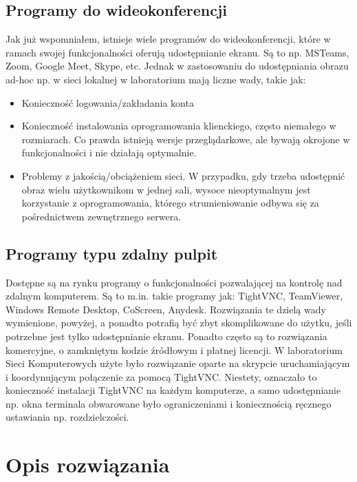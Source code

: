 \documentclass[a4paper,11pt]{article}
\begin{document}
        \subsection{Programy do wideokonferencji}
        Jak już wspomniałem, istnieje wiele programów do wideokonferencji, które w ramach swojej funkcjonalności oferują udostępnianie ekranu. Są to np. MSTeams, Zoom, Google Meet, Skype, etc.
        Jednak w zastosowaniu do udostępniania obrazu ad-hoc np. w sieci lokalnej w laboratorium mają liczne wady, takie jak:
        \begin{itemize}
            \item Konieczność logowania/zakładania konta
            \item Konieczność instalowania oprogramowania klienckiego, często niemałego w rozmiarach. Co prawda istnieją wersje przeglądarkowe, ale bywają okrojone w funkcjonalności i nie działają optymalnie. 
            \item Problemy z jakością/obciążeniem sieci. W przypadku, gdy trzeba udostępnić obraz wielu użytkownikom w jednej sali, wysoce nieoptymalnym jest korzystanie z oprogramowania, którego strumieniowanie
            odbywa się za pośrednictwem zewnętrznego serwera.   
        \end{itemize}     
        \subsection{Programy typu zdalny pulpit}
        Dostępne są na rynku programy o funkcjonalności pozwalającej na kontrolę nad zdalnym komputerem. 
        Są to m.in. takie programy jak: TightVNC, TeamViewer, Windows Remote Desktop, CoScreen, Anydesk. 
        Rozwiązania te dzielą wady wymienione, powyżej, a ponadto potrafią być zbyt skomplikowane do użytku, jeśli potrzebne jest tylko udostępnianie ekranu. 
        Ponadto często są to rozwiązania komercyjne, o zamkniętym kodzie źródłowym i płatnej licencji. 
        W laboratorium Sieci Komputerowych użyte było rozwiązanie oparte na skrypcie uruchamiającym i koordynującym połączenie za pomocą TightVNC. 
        Niestety, oznaczało to konieczność instalacji TightVNC na każdym komputerze, a samo udostępnianie np. okna terminala obwarowane było ograniczeniami i koniecznością ręcznego ustawiania np. rozdzielczości. 
    \section{Opis rozwiązania}
\end{document}
